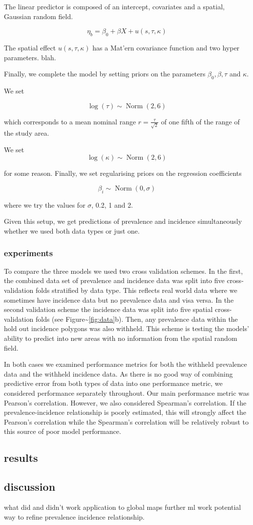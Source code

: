 The linear predictor is composed of an intercept, covariates and a
spatial, Gaussian random field.

\[\eta_b = \beta_0 + \beta X  + u(s, \tau, \kappa)\]

The spatial effect \(u(s, \tau, \kappa)\) has a Mat'ern covariance
function and two hyper parameters. blah.

Finally, we complete the model by setting priors on the parameters
\(\beta_0, \beta, \tau\) and \(\kappa\).

We set

\[\log(\tau)\sim \operatorname{ Norm}(2, 6)\]

which corresponds to a mean nominal range \(r = \frac{\tau}{\sqrt{2}}\)
of one fifth of the range of the study area.

We set \[\log(\kappa)\sim \operatorname{ Norm}(2, 6)\]

for some reason. Finally, we set regularising priors on the regression
coefficients

\[\beta_i \sim \operatorname{ Norm}(0, \sigma)\]

where we try the values for \(\sigma\), 0.2, 1 and 2.

Given this setup, we get predictions of prevalence and incidence
simultaneously whether we used both data types or just one.

\subsubsection{experiments}\label{experiments}

To compare the three models we used two cross validation schemes. In the
first, the combined data set of prevalence and incidence data was split
into five cross-validation folds stratified by data type. This reflects
real world data where we sometimes have incidence data but no prevalence
data and visa versa. In the second validation scheme the incidence data
was split into five spatial cross-validation folds (see
Figure\textasciitilde{}\ref{fig:data}b). Then, any prevalence data
within the hold out incidence polygons was also withheld. This scheme is
testing the models' ability to predict into new areas with no
information from the spatial random field.

In both cases we examined performance metrics for both the withheld
prevalence data and the withheld incidence data. As there is no good way
of combining predictive error from both types of data into one
performance metric, we considered performance separately throughout. Our
main performance metric was Pearson's correlation. However, we also
considered Spearman's correlation. If the prevalence-incidence
relationship is poorly estimated, this will strongly affect the
Pearson's correlation while the Spearman's correlation will be
relatively robust to this source of poor model performance.

\subsection{results}\label{results}

\subsection{discussion}\label{discussion}

what did and didn't work application to global maps further ml work
potential way to refine prevalence incidence relationship.

